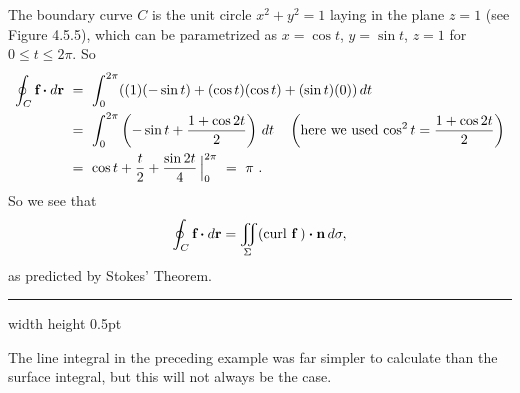 \begin{exmp}

 The boundary curve $C$ is the unit circle $x^2 + y^2 =1$ laying in the plane $z=1$ (see Figure 4.5.5), which can be
 parametrized as $x = \cos t$, $y = \sin t$, $z = 1$ for $0 \le t \le 2\pi$. So
 \begin{align*}
  \oint_{C} \textbf{f} \bm{\cdot} d\textbf{r} ~&=~ \int_0^{2\pi} ((1)(-\sin t) + (\cos t)(\cos t) + (\sin t)(0))\,dt\\
   &=~ \int_0^{2\pi} \left( -\sin t + \frac{1+\cos 2t}{2} \right) \,dt \quad \left( \text{here we used $\cos^2 t =
   \frac{1+\cos 2t}{2}$} \right)\\
   &=~ \cos t + \frac{t}{2} + \frac{\sin 2t}{4}\,\Big|_0^{2\pi} ~=~ \pi ~.
 \end{align*}
 So we see that 
 \[\oint_{C} \textbf{f} \bm{\cdot} d\textbf{r}=\iint_{\Sigma} (\text{curl}~{\mathbf{f}}\,) \bm{\cdot} \mathbf{n}
 \,d\sigma,\] as predicted by Stokes' Theorem.
\end{exmp}
\hrule width \textwidth height 0.5pt
\medskip

The line integral in the preceding example was far simpler to calculate than the surface integral, but this will not
always be the case.

